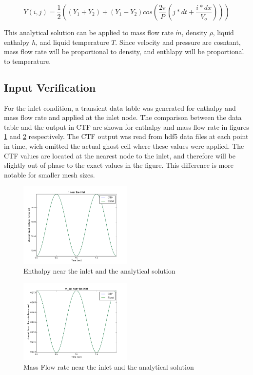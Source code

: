 \documentclass{mc2015}
\begin{document}
\begin{equation}
	Y(i,j) = \frac{1}{2} \left( 
			(Y_{1}+Y_{2}) + (Y_{1}-Y_{2}) cos\left(
				\frac{2 \pi}{P} \left( j*dt + \frac{i*dx}{V_{o}} \right)
				\right)
			\right)
\end{equation}

This analytical solution can be applied to mass flow rate $\dot{m}$,
density $\rho$, liquid enthalpy $h$, and liquid temperature $T$. Since velocity
and pressure are cosntant, mass flow rate will be proportional to density, and
enthlapy will be proportional to temperature.

\subsection{Input Verification}

For the inlet condition, a transient data table was generated for enthalpy and
mass flow rate and applied at the inlet node. The comparison between the data
table and the output in CTF are shown for enthalpy and mass flow rate in figures
\ref{fig:Inlet_h} and \ref{fig:Inlet_m_dot} respectively. The CTF output was
read from hdf5 data files at each point in time, wich omitted the actual ghost
cell where these values were applied. The CTF values are located at the nearest
node to the inlet, and therefore will be slightly out of phase to the exact
values in the figure. This difference is more notable for smaller mesh sizes.

\begin{figure}[!h]
	\centering
	\includegraphics[width=0.500\textwidth]{images/Code_Verification/run_00_00/residual/results/Inlet_h}
	\caption{Enthalpy near the inlet and the analytical solution}
	\label{fig:Inlet_h}
\end{figure}

\begin{figure}[!h]
	\centering
	\includegraphics[width=0.500\textwidth]{images/Code_Verification/run_00_00/residual/results/Inlet_m_dot}
	\caption{Mass Flow rate near the inlet and the analytical solution}
	\label{fig:Inlet_m_dot}
\end{figure}
\end{document}
